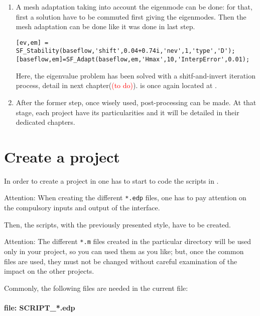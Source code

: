 \begin{enumerate}
\item A mesh adaptation taking into account the eigenmode can be done: for that, first a solution have to be commuted first giving the eigenmodes. Then the mesh adaptation can be done like it was done in last step. 
\begin{lstlisting}
[ev,em] = SF_Stability(baseflow,'shift',0.04+0.74i,'nev',1,'type','D');
[baseflow,em]=SF_Adapt(baseflow,em,'Hmax',10,'InterpError',0.01);
\end{lstlisting}

Here, the eigenvalue problem has been solved with a shitf-and-invert iteration process, detail in next chapter(\textcolor{red}{(to do)}).  is once again located at .

\item After the former step, once wisely used, post-processing can be made. At that stage, each project have its particularities and it will be detailed in their dedicated chapters.
\end{enumerate}

\section{Create a  project}

In order to create a project in  one has to start to code the scripts in .

\medskip

\begin{leftbar}
Attention:  When creating the different \texttt{*.edp} files, one has to pay attention on the compulsory inputs and output of the  interface.
\end{leftbar}

Then, the  scripts, with the previously presented style, have to be created.

\medskip

\begin{leftbar}
Attention:  The different \texttt{*.m} files created in the particular directory will be used only in your project, so you can used them as you like; but, once the common files are used, they must not be changed without careful examination of the impact on the other projects.
\end{leftbar}


Commonly, the following files are needed in the current file:

\paragraph{ file: SCRIPT\_*.edp}

